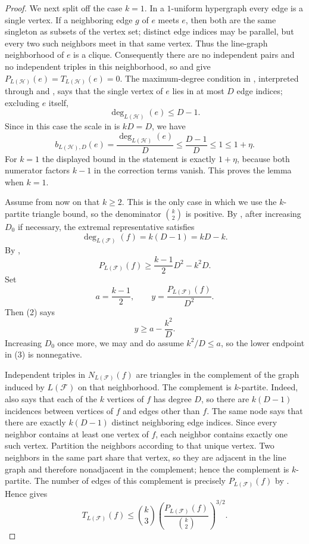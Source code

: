 \begin{proof}
We next split off the case $k=1$.  In a $1$-uniform hypergraph every edge is
a single vertex.  If a neighboring edge $g$ of $e$ meets $e$, then both are
the same singleton as subsets of the vertex set; distinct edge indices may
be parallel, but every two such neighbors meet in that same vertex.  Thus the
line-graph neighborhood of $e$ is a clique.  Consequently there are no
independent pairs and no independent triples in this neighborhood, so
 and  give
$P_{L(\mathcal H)}(e)=T_{L(\mathcal H)}(e)=0$.  The maximum-degree condition
in , interpreted through
 and , says that the
single vertex of $e$ lies in at most $D$ edge indices; excluding $e$ itself,
\[
\deg_{L(\mathcal H)}(e)\le D-1.
\]
Since in this case the scale in  is $kD=D$, we have
\[
b_{L(\mathcal H),D}(e)
=\frac{\deg_{L(\mathcal H)}(e)}D
\le \frac{D-1}{D}\le 1\le 1+\eta .
\]
For $k=1$ the displayed bound in the statement is exactly $1+\eta$, because
both numerator factors $k-1$ in the correction terms vanish.  This proves
the lemma when $k=1$.

Assume from now on that $k\ge2$.  This is the only case in which we use the
$k$-partite triangle bound, so the denominator $\binom{k}{2}$ is positive.
By , after increasing $D_0$ if
necessary, the extremal representative satisfies
\[
\deg_{L(\mathcal F)}(f)=k(D-1)=kD-k. \tag{1}
\]
By ,
\[
P_{L(\mathcal F)}(f)\ge \frac{k-1}{2}D^2-k^2D. \tag{2}
\]
Set
\[
a=\frac{k-1}{2},\qquad
y=\frac{P_{L(\mathcal F)}(f)}{D^2}.
\]
Then (2) says
\[
y\ge a-\frac{k^2}{D}. \tag{3}
\]
Increasing $D_0$ once more, we may and do assume
$k^2/D\le a$, so the lower endpoint in (3) is nonnegative.

Independent triples in $N_{L(\mathcal F)}(f)$ are triangles in the complement
of the graph induced by $L(\mathcal F)$ on that neighborhood.  The complement
is $k$-partite.  Indeed,  also
says that each of the $k$ vertices of $f$ has degree $D$, so there are
$k(D-1)$ incidences between vertices of $f$ and edges other than $f$.  The
same node says that there are exactly $k(D-1)$ distinct neighboring edge
indices.  Since every neighbor contains at least one vertex of $f$, each
neighbor contains exactly one such vertex.  Partition the neighbors according
to that unique vertex.  Two neighbors in the same part share that vertex, so
they are adjacent in the line graph and therefore nonadjacent in the
complement; hence the complement is $k$-partite.  The number of edges of this
complement is precisely $P_{L(\mathcal F)}(f)$ by
.  Hence
 gives
\[
T_{L(\mathcal F)}(f)
\le
\binom{k}{3}
\left(\frac{P_{L(\mathcal F)}(f)}{\binom{k}{2}}\right)^{3/2}. \tag{4}
\]


\end{proof}
